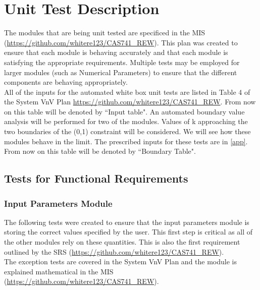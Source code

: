 \documentclass[12pt, titlepage]{article}
\begin{document}

\section{Unit Test Description} \label{testDescription} 

The modules that are being unit tested are specificed in the MIS 
(\url{https://github.com/whitere123/CAS741_REW}). This plan was created to 
ensure that each module is behaving accurately and that each module is 
satisfying the appropriate requirements.  Multiple tests may be employed for 
larger modules (such as Numerical Parameters) to ensure that the different 
components are behaving appropriately. \\ 

All of the inputs for the automated white box unit tests are listed in Table 4 
of the System VnV Plan \url{https://github.com/whitere123/CAS741_REW}. From now 
on this table will be denoted by ``Input table". An automated boundary value 
analysis will be performed for two of the modules. Values of k approaching the 
two boundaries of the (0,1) constraint will be considered. We will see how 
these modules behave in the limit. The prescribed inputs for these tests are in 
\ref{app}. From now on this table will be denoted by ``Boundary Table". 

\subsection{Tests for Functional Requirements}


\subsubsection{Input Parameters Module}

The following tests were created to ensure that the input parameters module is 
storing the correct values specified by the user. This first step is critical 
as all of the other modules rely on these quantities. This is also the first 
requirement outlined by the SRS 
(\url{https://github.com/whitere123/CAS741_REW}). \\
The exception tests are covered in the System 
VnV Plan and the module is explained mathematical in the 
MIS (\url{https://github.com/whitere123/CAS741_REW}). \\
\end{document}
